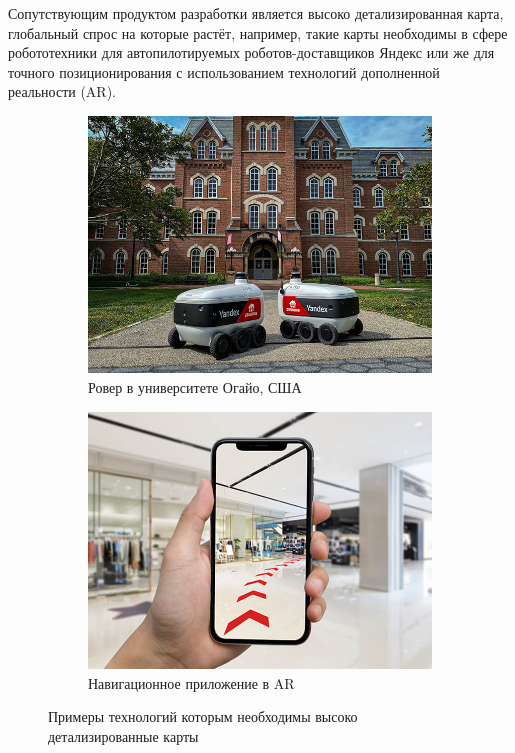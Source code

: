     Сопутствующим продуктом разработки является высоко детализированная карта, глобальный спрос на которые растёт, например, такие карты необходимы в сфере робототехники для автопилотируемых роботов-доставщиков Яндекс или же для точного позиционирования с использованием технологий дополненной реальности (AR).
    \begin{figure}[H]
      \centering
      \begin{subfigure}[b]{0.45\textwidth}
        \centering
        \includegraphics[width=\textwidth]{assets/img/rover.jpg}
        \caption{Ровер в университете Огайо, США}
      \end{subfigure}
      \hfill
      \begin{subfigure}[b]{.45\textwidth}
        \centering
        \includegraphics[width=\textwidth]{assets/img/AR.jpg}
        \caption{Навигационное приложение в AR}
      \end{subfigure}
      \caption{Примеры технологий которым необходимы высоко детализированные карты}
    \end{figure}

